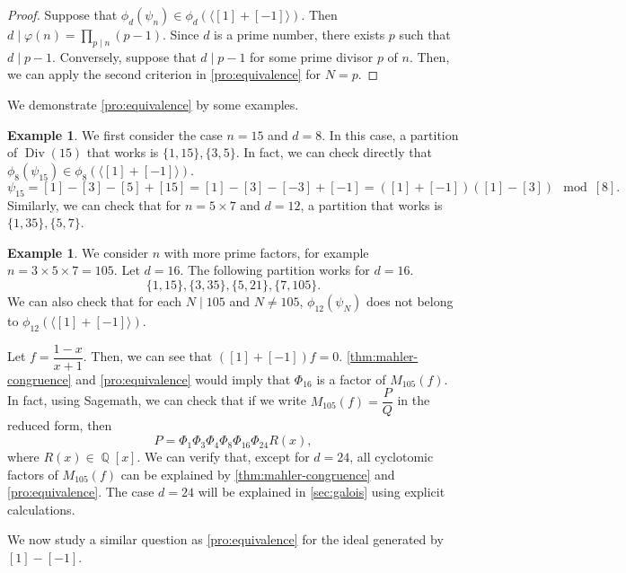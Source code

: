 \documentclass[12t,a4paper]{amsart}
\theoremstyle{definition}
\newtheorem{expl}[thm]{Example}
\DeclareMathOperator{\Q}{\mathbb{Q}}
\DeclareMathOperator{\Div}{\text{Div}}
\numberwithin{equation}{section}
\begin{document}
{{\begin{proof}
    Suppose that $\phi_d(\psi_n)\in \phi_d(\langle [1] + [-1] \rangle)$. Then $d \mid \varphi(n)=\prod_{p \mid n}(p-1).$ Since $d$ is a prime number, there exists $p$ such that $d \mid p-1.$ Conversely, suppose that $d \mid p-1$ for some prime divisor $p$ of $n.$ Then, we can apply the second criterion in \cref{pro:equivalence} for $N=p$. 
\end{proof}

}

We demonstrate \cref{pro:equivalence} by some examples. 
\begin{expl}
We first consider the case $n=15$ and $d=8.$ In this case, a partition of $\Div(15)$ that works is $\{1, 15\}, \{3, 5\}.$ In fact, we can check directly that $\phi_{8}(\psi_{15}) \in \phi_8(\langle [1]+[-1] \rangle )$. 
    \[ \psi_{15}=[1]-[3]-[5]+[15]=[1]-[3]-[-3]+[-1]=([1]+[-1])([1]-[3]) \mod{[8]}.\]
Similarly, we can check that for $n=5 \times 7$ and $d=12$, a partition that works is $\{1, 35\}, \{5, 7\}.$
\end{expl}

\begin{expl}
\label{ex:3x5x7}
We  consider $n$ with more prime factors, for example $n=3 \times 5 \times 7=105.$ Let $d=16$. The following partition works for $d=16$.
\[ \{1, 15 \}, \{3, 35 \}, \{5, 21\}, \{7, 105\}. \]
We can also check that for each $N \mid 105$ and $N\not=105$, $\phi_{12}(\psi_N)$ does not belong to $\phi_{12}(\langle [1]+[-1] \rangle ).$



Let $f=\dfrac{1-x}{x+1}$. Then, we can see that $([1]+[-1])f=0.$ \cref{thm:mahler-congruence} and \cref{pro:equivalence} would imply that $\Phi_{16}$ is a factor of $M_{105}(f).$ In fact, using Sagemath, we can check that if we write $M_{105}(f)=\dfrac{P}{Q}$ in the reduced form, then 
\[ P=\Phi_1 \Phi_3 \Phi_4 \Phi_8 \Phi_{16} \Phi_{24} R(x), \]
where $R(x) \in \Q[x].$ We can verify that, except for $d=24$, all cyclotomic factors of $M_{105}(f)$ can be explained by \cref{thm:mahler-congruence} and \cref{pro:equivalence}. The case $d=24$ will be explained in \cref{sec:galois} using explicit calculations. 
\end{expl}

We now study a similar question as \cref{pro:equivalence} for the ideal generated by $[1]-[-1].$

}
\end{document}
